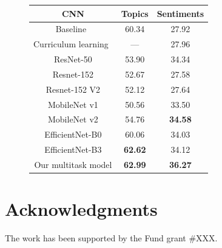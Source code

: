 \documentclass{zapiski}
\begin{document}
\begin{figure}[!tbh]
    \footnotesize\setlength{\tabcolsep}{2.8pt}
    \begin{tabular}{|c|c|c|}
    \hline
        CNN & Topics & Sentiments \\
        \hline
        Baseline~\cite{hussain2017automatic} & 60.34& 27.92\\
        Curriculum learning~\cite{10.1007/978-3-030-01216-8_36} & --- & 27.96\\
        \hline
        ResNet-50 & 53.90 & 34.34 \\
        Resnet-152 & 52.67 & 27.58 \\
        Resnet-152 V2 & 52.12 & 27.64 \\
        MobileNet v1& 50.56 & 33.50\\
        MobileNet v2 & 54.76  & \textbf{34.58}\\
        EfficientNet-B0 & 60.06 & 34.03\\
        EfficientNet-B3 & \textbf{62.62} & 34.12 \\
        \hline
        Our multitask model & \textbf{62.99} & \textbf{36.27} \\ \hline
    \end{tabular}
    \label{tab:topics_sentiments_overall_accuracy}
\end{figure}



\section*{Acknowledgments}
The work has been supported by the Fund grant \#XXX. 

% 
% 
\end{document}
